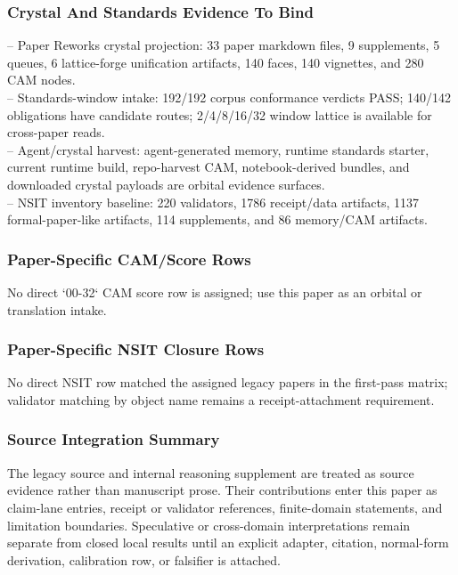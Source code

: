 \documentclass[11pt]{article}
\begin{document}
\subsubsection*{Crystal And Standards Evidence To Bind}

\noindent{}-- Paper Reworks crystal projection: 33 paper markdown files, 9 supplements, 5 queues, 6 lattice-forge unification artifacts, 140 faces, 140 vignettes, and 280 CAM nodes.\\
\noindent{}-- Standards-window intake: 192/192 corpus conformance verdicts PASS; 140/142 obligations have candidate routes; 2/4/8/16/32 window lattice is available for cross-paper reads.\\
\noindent{}-- Agent/crystal harvest: agent-generated memory, runtime standards starter, current runtime build, repo-harvest CAM, notebook-derived bundles, and downloaded crystal payloads are orbital evidence surfaces.\\
\noindent{}-- NSIT inventory baseline: 220 validators, 1786 receipt/data artifacts, 1137 formal-paper-like artifacts, 114 supplements, and 86 memory/CAM artifacts.\\

\subsubsection*{Paper-Specific CAM/Score Rows}

No direct `00-32` CAM score row is assigned; use this paper as an orbital or translation intake.

\subsubsection*{Paper-Specific NSIT Closure Rows}

No direct NSIT row matched the assigned legacy papers in the first-pass matrix; validator matching by object name remains a receipt-attachment requirement.

\subsubsection*{Source Integration Summary}

The legacy source and internal reasoning supplement are treated as source
evidence rather than manuscript prose. Their contributions enter this paper as
claim-lane entries, receipt or validator references, finite-domain statements,
and limitation boundaries. Speculative or cross-domain interpretations remain
separate from closed local results until an explicit adapter, citation,
normal-form derivation, calibration row, or falsifier is attached.
\end{document}
